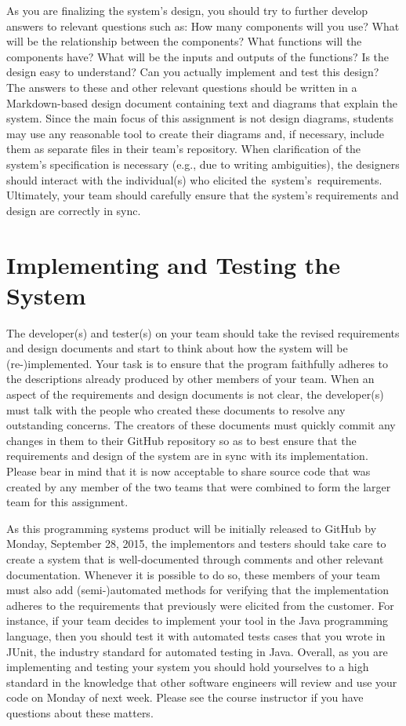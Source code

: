 As you are finalizing the system's design, you should try to further develop answers to relevant questions such as: How
many components will you use? What will be the relationship between the components? What functions will the components
have?  What will be the inputs and outputs of the functions?  Is the design easy to understand?  Can you actually
implement and test this design? The answers to these and other relevant questions should be written in a Markdown-based
design document containing text and diagrams that explain the system. Since the main focus of this assignment is not
design diagrams, students may use any reasonable tool to create their diagrams and, if necessary, include them as
separate files in their team's repository.  When clarification of the system's specification is necessary (e.g., due to
writing ambiguities), the designers should interact with the individual(s) who elicited \mbox{the system's
requirements}.  Ultimately, your team should carefully ensure that the system's requirements and design are correctly in
sync.

\vspace*{-.05in}
\section*{Implementing and Testing the System}

The developer(s) and tester(s) on your team should take the revised requirements and design documents and start to think
about how the system will be (re-)implemented. Your task is to ensure that the program faithfully adheres to the descriptions
already produced by other members of your team. When an aspect of the requirements and design documents is not clear,
the developer(s) must talk with the people who created these documents to resolve any outstanding concerns. The creators
of these documents must quickly commit any changes in them to their GitHub repository so as to best ensure that the
requirements and design of the system are in sync with its implementation. Please bear in mind that it is now acceptable
to share source code that was created by any member of the two teams that were combined to form the larger team for this
assignment.

As this programming systems product will be initially released to GitHub by Monday, September 28, 2015, the implementors
and testers should take care to create a system that is well-documented through comments and other relevant
documentation. Whenever it is possible to do so, these members of your team must also add (semi-)automated methods for
verifying that the implementation adheres to the requirements that previously were elicited from the customer. For
instance, if your team decides to implement your tool in the Java programming language, then you should test it
with automated tests cases that you wrote in JUnit, the industry standard for automated testing in Java. Overall, as you
are implementing and testing your system you should hold yourselves to a high standard in the knowledge that other
software engineers will review and use your code on Monday of next week. Please see the course instructor if you have
questions about these matters.

